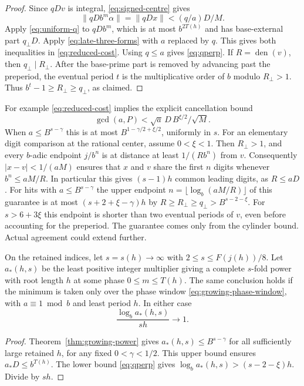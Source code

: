 \begin{proof}
Since \(q Dv\) is integral, \eqref{eq:signed-centre} gives
\[
 \|qD b^m\alpha\|=\|qD x\|< (q/a)D/M .
\]
Apply \eqref{eq:uniform-q} to \(qD b^m\), which is at most
\(b^{2T(h)}\) and has base-external part \(q_\perp D\).
Apply \eqref{eq:late-three-forms} with \(a\) replaced by \(q\).
This gives both inequalities in \eqref{eq:reduced-cost}.
Using \(q\le a\) gives \eqref{eq:qperp}.
If \(R=\operatorname{den}(v)\), then \(q_\perp\mid R_\perp\).
After the base-prime part is removed by advancing past the
preperiod, the eventual period \(t\) is the multiplicative order
of \(b\) modulo \(R_\perp>1\). Thus \(b^t-1\ge R_\perp\ge
q_\perp\), as claimed.
\end{proof}

For example \eqref{eq:reduced-cost} implies the explicit cancellation
bound
\[
 \gcd(a,P)<\sqrt{a}\,D\,B^{\xi/2}/\sqrt{M}.
\]
When \(a\le B^{s-\gamma}\) this is at most
\(B^{1-\gamma/2+\xi/2}\), uniformly in \(s\).
For an elementary digit comparison at the rational center, assume
\(0<\xi<1\). Then \(R_\perp>1\), and every \(b\)-adic endpoint
\(j/b^n\) is at distance at least \(1/(R b^n)\) from \(v\).
Consequently \(|x-v|<1/(aM)\) ensures that \(x\) and \(v\)
share the first \(n\) digits whenever \(b^n\le aM/R\).
In particular this gives \((s-1)h\) common leading digits, as
\(R\le aD\). For hits with \(a\le B^{s-\gamma}\) the
upper endpoint \(n=\lfloor\log_b(aM/R)\rfloor\) of this
guarantee is at most \((s+2+\xi-\gamma)h\) by
\(R\ge R_\perp\ge q_\perp > B^{s-2-\xi}\).
For \(s>6+3\xi\) this endpoint is shorter than two eventual
periods of \(v\), even before accounting for the preperiod.
The guarantee comes only from the cylinder bound. Actual
agreement could extend further.

\begin{corollary}\label{cor:leading-cost}
On the retained indices, let \(s=s(h)\to\infty\) with
\(2\le s\le F(j(h))/8\). Let \(a_*(h,s)\) be the least
positive integer multiplier giving a complete \(s\)-fold power
with root length \(h\) at some phase \(0\le m\le T(h)\).
The same conclusion holds if the minimum is taken only over the
phase window \eqref{eq:growing-phase-window}, with
\(a\equiv1\bmod b\) and least period \(h\). In either case
\[
       \frac{\log_b a_*(h,s)}{s h}\longrightarrow 1 .
\]
\end{corollary}

\begin{proof}
Theorem~\ref{thm:growing-power} gives
\(a_*(h,s)\le B^{s-\gamma}\) for all sufficiently large retained
\(h\), for any fixed \(0<\gamma<1/2\).
This upper bound ensures \(a_*D\le b^{T(h)}\).
The lower bound \eqref{eq:qperp} gives
\(\log_b a_*(h,s)>(s-2-\xi)h\). Divide by \(sh\).
\end{proof}

